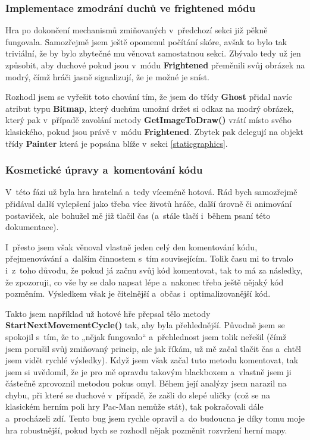 \documentclass{article}
\begin{document}
\subsubsection{Implementace zmodrání duchů ve frightened módu} \label{frightenedmode}
Hra po dokončení mechanismů zmiňovaných v~předchozí sekci již pěkně fungovala. Samozřejmě jsem ještě opomenul počítání skóre, avšak to bylo tak triviální, že by bylo zbytečné mu věnovat samostatnou sekci. Zbývalo tedy už jen způsobit, aby duchové pokud jsou v~módu \textbf{Frightened} přeměnili svůj obrázek na modrý, čímž hráči jasně signalizují, že je možné je sníst. 

Rozhodl jsem se vyřešit toto chování tím, že jsem do třídy \textbf{Ghost} přidal navíc atribut typu \textbf{Bitmap}, který duchům umožní držet si odkaz na modrý obrázek, který pak v~případě zavolání metody \textbf{GetImageToDraw()} vrátí místo svého klasického, pokud jsou právě v~módu \textbf{Frightened}. Zbytek pak delegují na objekt třídy \textbf{Painter} která je popsána blíže v~sekci \ref{staticgraphics}.

\subsubsection{Kosmetické úpravy a~komentování kódu}
V~této fázi už byla hra hratelná a~tedy víceméně hotová. Rád bych samozřejmě přidával další vylepšení jako třeba více životů hráče, další úrovně či animování postaviček, ale bohužel mě již tlačil čas (a~stále tlačí i~během psaní této dokumentace). 

I~přesto jsem však věnoval vlastně jeden celý den komentování kódu, přejmenovávání a~dalším činnostem s~tím souvisejícím. Tolik času mi to trvalo i~z~toho důvodu, že pokud já začnu svůj kód komentovat, tak to má za následky, že zpozoruji, co vše by se dalo napsat lépe a~nakonec třeba ještě nějaký kód pozměním. Výsledkem však je čitelnější a~občas i~optimalizovanější kód. 

Takto jsem například už hotové hře přepsal tělo metody \textbf{StartNextMovementCycle()} tak, aby byla přehlednější. Původně jsem se spokojil s~tím, že to „nějak fungovalo“ a~přehlednost jsem tolik neřešil (čímž jsem porušil svůj zmiňovaný princip, ale jak říkám, už mě začal tlačit čas a~chtěl jsem vidět rychlé výsledky). Když jsem však začal tuto metodu komentovat, tak jsem si uvědomil, že je pro mě opravdu takovým blackboxem a~vlastně jsem ji částečně zprovoznil metodou pokus omyl. Během její analýzy jsem narazil na chybu, při které se duchové v~případě, že zašli do slepé uličky (což se na klasickém herním poli hry Pac-Man nemůže stát), tak pokračovali dále a~procházeli zdí. Tento bug jsem rychle opravil a~do budoucna je díky tomu moje hra robustnější, pokud bych se rozhodl nějak pozměnit rozvržení herní mapy.
\end{document}
